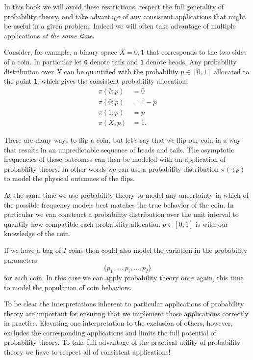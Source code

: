 \documentclass[
  letterpaper,
  DIV=11,
  numbers=noendperiod]{scrartcl}
\begin{document}
In this book we will avoid these restrictions, respect the full
generality of probability theory, and take advantage of any consistent
applications that might be useful in a given problem. Indeed we will
often take advantage of multiple applications \emph{at the same time}.

Consider, for example, a binary space \(X = {0, 1}\) that corresponds to
the two sides of a coin. In particular let \texttt{0} denote tails and
\texttt{1} denote heads. Any probability distribution over \(X\) can be
quantified with the probability \(p \in [0, 1]\) allocated to the point
\texttt{1}, which gives the consistent probability allocations
\begin{align*}
\pi( \emptyset; p ) &= 0
\\
\pi( {0}; p ) &= 1 - p
\\
\pi( {1}; p ) &= p
\\
\pi( X; p ) &= 1.
\end{align*}

There are many ways to flip a coin, but let's say that we flip our coin
in a way that results in an unpredictable sequence of heads and tails.
The asymptotic frequencies of these outcomes can then be modeled with an
application of probability theory. In other words we can use a
probability distribution \(\pi(\cdot; p)\) to model the physical
outcomes of the flips.

At the same time we use probability theory to model any uncertainty in
which of the possible frequency models best matches the true behavior of
the coin. In particular we can construct a probability distribution over
the unit interval to quantify how compatible each probability allocation
\(p \in [0, 1]\) is with our knowledge of the coin.

If we have a bag of \(I\) coins then could also model the variation in
the probability parameters \[
\{ p_{1}, \ldots, p_{i}, \ldots, p_{I} \}
\] for each coin. In this case we can apply probability theory once
again, this time to model the population of coin behaviors.

To be clear the interpretations inherent to particular applications of
probability theory are important for ensuring that we implement those
applications correctly in practice. Elevating one interpretation to the
exclusion of others, however, excludes the corresponding applications
and limits the full potential of probability theory. To take full
advantage of the practical utility of probability theory we have to
respect all of consistent applications!
\end{document}
